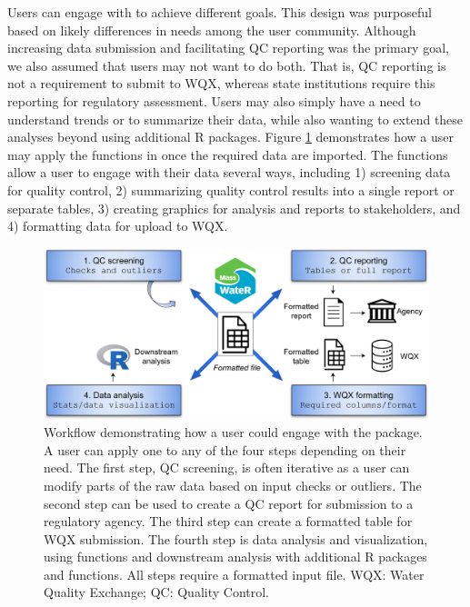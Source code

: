 Users can engage with  to achieve different goals. This design was purposeful based on likely differences in needs among the user community. Although increasing data submission and facilitating QC reporting was the primary goal, we also assumed that users may not want to do both. That is, QC reporting is not a requirement to submit to WQX, whereas state institutions require this reporting for regulatory assessment. Users may also simply have a need to understand trends or to summarize their data, while also wanting to extend these analyses beyond  using additional R packages. Figure \ref{fig:workflow} demonstrates how a user may apply the functions in  once the required data are imported. The functions allow a user to engage with their data several ways, including 1) screening data for quality control, 2) summarizing quality control results into a single report or separate tables, 3) creating graphics for analysis and reports to stakeholders, and 4) formatting data for upload to WQX.

\begin{figure}
\includegraphics[width=1\linewidth]{figs/workflow} \caption{Workflow demonstrating how a user could engage with the  package.  A user can apply one to any of the four steps depending on their need.  The first step, QC screening, is often iterative as a user can modify parts of the raw data based on input checks or outliers.  The second step can be used to create a QC report for submission to a regulatory agency.  The third step can create a formatted table for WQX submission.  The fourth step is data analysis and visualization, using  functions and downstream analysis with additional R packages and functions.  All steps require a formatted input file.  WQX: Water Quality Exchange; QC: Quality Control.}\label{fig:workflow}
\end{figure}

